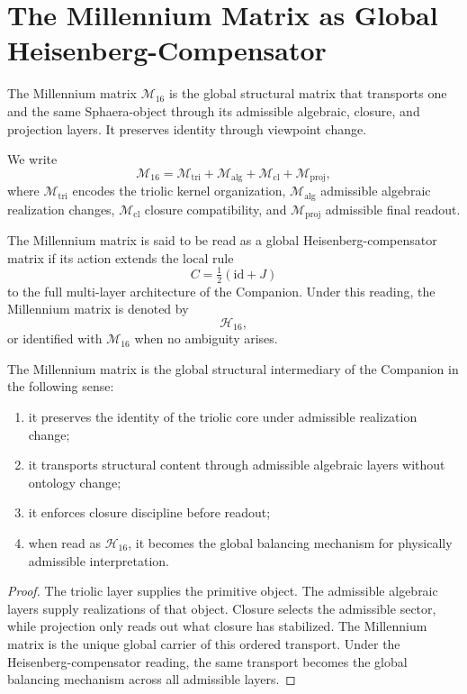 \section{The Millennium Matrix as Global Heisenberg-Compensator}
\label{sec:millennium-hc}

\begin{definition}
The Millennium matrix $\mathcal M_{16}$ is the global structural matrix that
transports one and the same Sphaera-object through its admissible algebraic,
closure, and projection layers. It preserves identity through viewpoint
change.
\end{definition}

\begin{definition}
We write
\[
\mathcal M_{16}
=
\mathcal M_{\mathrm{tri}}
+
\mathcal M_{\mathrm{alg}}
+
\mathcal M_{\mathrm{cl}}
+
\mathcal M_{\mathrm{proj}},
\]
where $\mathcal M_{\mathrm{tri}}$ encodes the triolic kernel organization,
$\mathcal M_{\mathrm{alg}}$ admissible algebraic realization changes,
$\mathcal M_{\mathrm{cl}}$ closure compatibility, and
$\mathcal M_{\mathrm{proj}}$ admissible final readout.
\end{definition}

\begin{definition}
The Millennium matrix is said to be read as a global Heisenberg-compensator
matrix if its action extends the local rule
\[
C=\tfrac12(\mathrm{id}+J)
\]
to the full multi-layer architecture of the Companion. Under this reading, the
Millennium matrix is denoted by
\[
\mathcal H_{16},
\]
or identified with $\mathcal M_{16}$ when no ambiguity arises.
\end{definition}

\begin{theorem}
\label{thm:mm-role}
The Millennium matrix is the global structural intermediary of the Companion in
the following sense:
\begin{enumerate}
  \item it preserves the identity of the triolic core under admissible
  realization change;
  \item it transports structural content through admissible algebraic layers
  without ontology change;
  \item it enforces closure discipline before readout;
  \item when read as $\mathcal H_{16}$, it becomes the global balancing
  mechanism for physically admissible interpretation.
\end{enumerate}
\end{theorem}

\begin{proof}
The triolic layer supplies the primitive object. The admissible algebraic
layers supply realizations of that object. Closure selects the admissible
sector, while projection only reads out what closure has stabilized. The
Millennium matrix is the unique global carrier of this ordered transport.
Under the Heisenberg-compensator reading, the same transport becomes the
global balancing mechanism across all admissible layers.
\end{proof}

